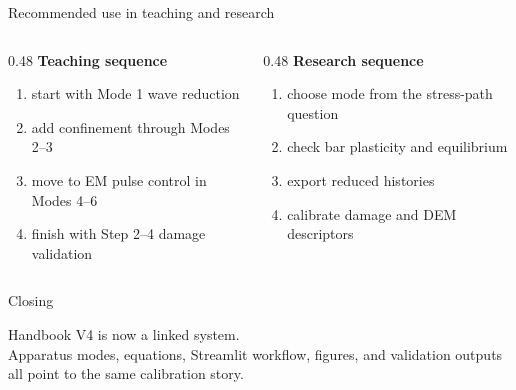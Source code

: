 \documentclass[11pt,aspectratio=169]{beamer}
\begin{document}
\begin{frame}{Recommended use in teaching and research}
  \begin{columns}[T,onlytextwidth]
    \begin{column}{0.48\textwidth}
      \textbf{Teaching sequence}
      \begin{enumerate}
        \item start with Mode 1 wave reduction
        \item add confinement through Modes 2--3
        \item move to EM pulse control in Modes 4--6
        \item finish with Step 2--4 damage validation
      \end{enumerate}
    \end{column}
    \begin{column}{0.48\textwidth}
      \textbf{Research sequence}
      \begin{enumerate}
        \item choose mode from the stress-path question
        \item check bar plasticity and equilibrium
        \item export reduced histories
        \item calibrate damage and DEM descriptors
      \end{enumerate}
    \end{column}
  \end{columns}
\end{frame}

\begin{frame}{Closing}
  \begin{center}
    \Large Handbook V4 is now a linked system.\\[6pt]
    \normalsize Apparatus modes, equations, Streamlit workflow, figures, and
    validation outputs all point to the same calibration story.
  \end{center}
\end{frame}
\end{document}
